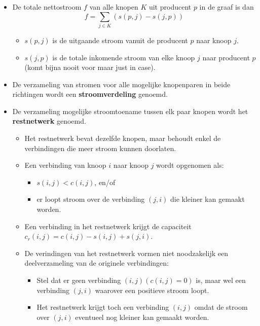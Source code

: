 \begin{itemize}
\begin{itemize}
    \end{itemize}
    \item De totale nettostroom $f$ van alle knopen $K$ uit producent $p$ in de graaf is dan 
    $$f = \sum_{j \in K} (s(p, j) - s(j, p))$$ 
    \begin{itemize}
        \item $s(p, j)$ is de uitgaande stroom vanuit de producent $p$ naar knoop $j$.
        \item $s(j, p)$ is de totale inkomende stroom van elke knoop $j$ naar producent $p$ (komt bijna nooit voor maar just in case). 
    \end{itemize}
    \item De verzameling van stromen voor alle mogelijke knopenparen in beide richtingen wordt een \textbf{stroomverdeling} genoemd.
    \item De verzameling mogelijke stroomtoename tussen elk paar knopen wordt het \textbf{restnetwerk} genoemd.
    \begin{itemize}
        \item Het restnetwerk bevat dezelfde knopen, maar behoudt enkel de verbindingen die meer stroom kunnen doorlaten.
        \item Een verbinding van knoop $i$ naar knoop $j$ wordt opgenomen als:
        \begin{itemize}
            \item  $s(i, j) < c(i, j)$, en/of
            \item  er loopt stroom over de verbinding $(j, i)$ die kleiner kan gemaakt worden.
        \end{itemize}
        \item Een verbinding in het restnetwerk krijgt de capaciteit $c_r(i, j) = c(i, j) - s(i, j) + s(j, i)$.
        \item De verindingen van het restnetwerk vormen niet noodzakelijk een deelverzameling van de originele verbindingen:
        \begin{itemize}
            \item Stel dat er geen verbinding $(i, j) (c(i, j) = 0)$ is, maar wel een verbinding $(j, i)$ waarover een positieve stroom loopt.
            \item Het restnetwerk krijgt toch een verbinding $(i, j)$ omdat de stroom over $(j, i)$ eventueel nog kleiner kan gemaakt worden.
        \end{itemize}
        

\end{itemize}
\end{itemize}
